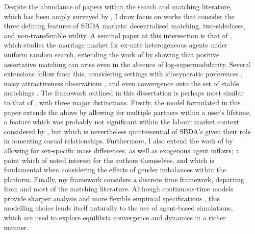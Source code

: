 Despite the abundance of papers within the search and matching literature, which has been amply surveyed by \cite{chade2017sorting}, I draw focus on works that consider the three defining features of SBDA markets: decentralised matching, two-sidedness, and non-transferable utility. A seminal paper at this intersection is that of \cite{burdett1997marriage}, which studies the marriage market for ex-ante heterogeneous agents under uniform random search, extending the work of \cite{becker1973theory} by showing that positive assortative matching can arise even in the absence of log-supermodularity.
Several extensions follow from this, considering settings with idiosyncratic preferences \citep{burdett1998two}, noisy attractiveness observations \citep{chade2006matching}, and even convergence onto the set of stable matchings \citep{adachi2003search}. The framework outlined in this dissertation is perhaps most similar to that of \cite{burdett1998two}, with three major distinctions. 
Firstly, the model formulated in this paper extends the above by allowing for multiple partners within a user's lifetime, a feature which was probably not significant within the labour market context considered by \cite{burdett1998two}, but which is nevertheless quintessential of SBDA's given their role in fomenting casual relationships.
Furthermore, I also extend the work of \citeauthor{burdett1998two} by allowing for sex-specific mass differences, as well as exogenous agent inflows; a point which of noted interest for the authors themselves, and which is fundamental when considering the effects of gender imbalances within the platform. 
Finally, my framework considers a discrete time framework, departing from \cite{burdett1998two} and most of the matching literature. Although continuous-time models provide sharper analysis and more flexible empirical specifications \citep{burdett1999long}, this modelling choice lends itself naturally to the use of agent-based simulations, which are used to explore equilibria convergence and dynamics in a richer manner. 

